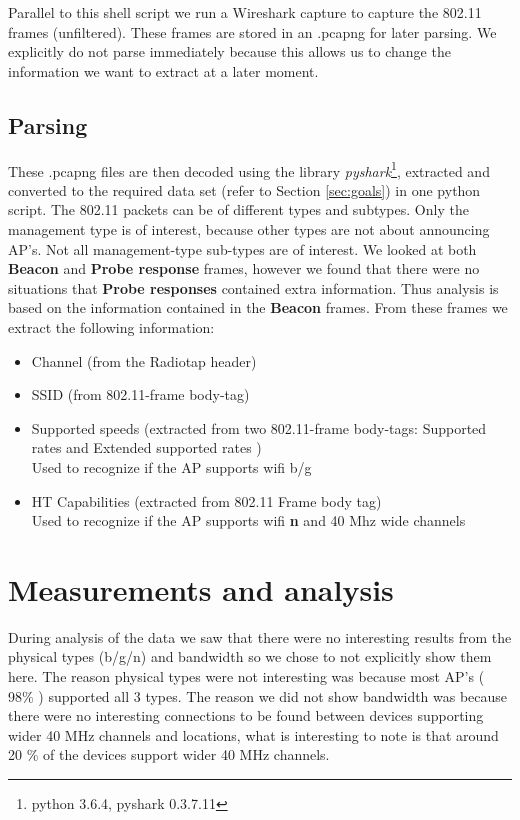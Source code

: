 \documentclass[11pt,a4paper]{article}
\begin{document}
Parallel to this shell script we run a Wireshark capture to capture the 802.11 frames (unfiltered).
These frames are stored in an .pcapng for later parsing. We explicitly do not parse immediately because this allows us to change the information we want to extract at a later moment.
\subsection{Parsing}
These .pcapng files are then decoded using the library \emph{pyshark}\footnote{python 3.6.4, pyshark 0.3.7.11}, extracted and converted to the required data set (refer to Section \ref{sec:goals}) in one python script. The 802.11 packets can be of different types and subtypes. Only the management type is of interest, because other types are not about announcing AP's. Not all management-type sub-types are of interest. We looked at both \textbf{Beacon} and \textbf{Probe response} frames, however we found that there were no situations that \textbf{Probe responses} contained extra information. Thus analysis is based on the information contained in the \textbf{Beacon} frames.
From these frames we extract the following information:
\begin{itemize}
    \item Channel (from the Radiotap header)
    \item SSID (from 802.11-frame body-tag)
    \item Supported speeds (extracted from two 802.11-frame body-tags: Supported rates and Extended supported rates )\\ 
    Used to recognize if the AP supports wifi b/g
    \item HT Capabilities (extracted from 802.11 Frame body tag)\\ 
    Used to recognize if the AP supports wifi \textbf{n} and 40 Mhz 
    wide channels
\end{itemize}

\section{Measurements and analysis}
\label{sec:measurements}
During analysis of the data we saw that there were no interesting results from the physical types (b/g/n) and bandwidth so we chose to not explicitly show them here. The reason physical types were not interesting was because most AP's ( 98\% ) supported all 3 types. The reason we did not show bandwidth was because there were no interesting connections to be found between devices supporting wider 40 MHz channels and locations, what is interesting to note is that around 20 \% of the devices support wider 40 MHz channels.
\end{document}
